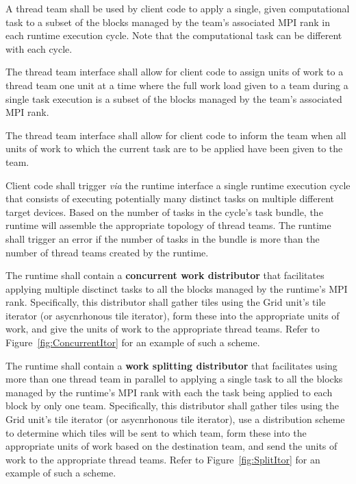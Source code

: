 \documentclass{article}
\begin{document}
\begin{req}
A thread team shall be used by client code to apply a single, given
computational task to a subset of the blocks managed by the team's associated
MPI rank in each runtime execution cycle.  Note that the computational task can
be different with each cycle.
\end{req}

\begin{req}
The thread team interface shall allow for client code to assign units of
work to a thread team one unit at a time where the full work load given to a
team during a single task execution is a subset of the blocks managed by the
team's associated MPI rank.
\end{req}

\begin{req}
The thread team interface shall allow for client code to inform the team when
all units of work to which the current task are to be applied have been given to
the team.
\end{req}

\begin{req}
Client code shall trigger \textit{via} the runtime interface a single runtime
execution cycle that consists of executing potentially many distinct tasks on
multiple different target devices.  Based on the number of tasks in the cycle's
task bundle, the runtime will assemble the appropriate topology of thread teams.
The runtime shall trigger an error if the number of tasks in the bundle is more
than the number of thread teams created by the runtime.
\end{req}

\begin{req}
The runtime shall contain a \textbf{concurrent work distributor} that
facilitates applying multiple disctinct tasks to all the blocks managed by the
runtime's MPI rank.  Specifically, this distributor shall gather tiles using the
Grid unit's tile iterator (or asycnrhonous tile iterator), form these into the
appropriate units of work, and give the units of work to the appropriate thread
teams.  Refer to Figure~\ref{fig:ConcurrentItor} for an example of such a scheme.
\end{req}

\begin{req}
The runtime shall contain a \textbf{work splitting distributor} that facilitates
using more than one thread team in parallel to applying a single task to all the
blocks managed by the runtime's MPI rank with each the task being applied to
each block by only one team.  Specifically, this distributor shall
gather tiles using the Grid unit's tile iterator (or asycnrhonous tile
iterator), use a distribution scheme to determine which tiles will be sent to
which team, form these into the appropriate units of work based on the
destination team, and send the units of work to the appropriate thread teams.
Refer to Figure~\ref{fig:SplitItor} for an example of such a scheme.
\end{req}
\end{document}
